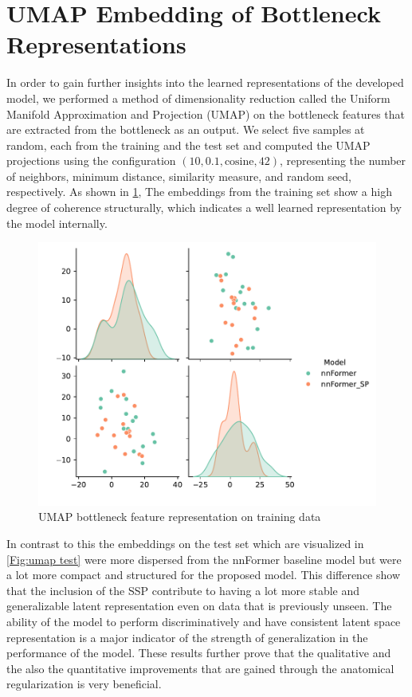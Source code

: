\section{UMAP Embedding of Bottleneck Representations}
In order to gain further insights into the learned representations of the developed model, we performed a method of dimensionality reduction called the Uniform Manifold Approximation and Projection (UMAP) \cite{McInnes2018} on the bottleneck features that are extracted from the bottleneck as an output. We select five samples at random, each from the training and the test set and computed the UMAP projections using the configuration $(10, 0.1, \text{cosine}, 42)$, representing the number of neighbors, minimum distance, similarity measure, and random seed, respectively. As shown in \cref{Fig:umap train}, The embeddings from the training set show a high degree of coherence structurally, which indicates a well learned representation by the model internally. 

\begin{figure}[htb!] %
\centering
\centering
\includegraphics[width=1\textwidth]{images/Umap_train.pdf}
\caption{\centering UMAP bottleneck feature representation on training data}
\label{Fig:umap train}
\end{figure}

In contrast to this the embeddings on the test set which are visualized in \cref{Fig:umap test} were more dispersed from the nnFormer baseline model but were a lot more compact and structured for the proposed model. This difference show that the inclusion of the SSP contribute to having a lot more stable and generalizable latent representation even on data that is previously unseen. The ability of the model to perform discriminatively and have consistent latent space representation is a major indicator of the strength of generalization in the performance of the model. These results further prove that the qualitative and the also the quantitative improvements that are gained through the anatomical regularization is very beneficial.

